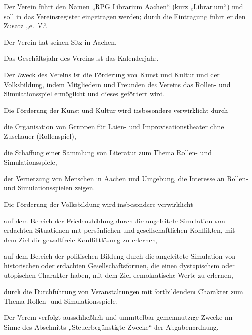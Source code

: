



\subject{Satzung des RPG Librarium Aachen}
\begin{contract}
	\item Der Verein führt den Namen „RPG Librarium Aachen“ (kurz „Librarium“) und soll in das Vereinsregister eingetragen werden; durch die Eintragung führt er den Zusatz „e.~V.“.
	\item Der Verein hat seinen Sitz in Aachen.
	\item Das Geschäftsjahr des Vereins ist das Kalenderjahr.
	\item Der Zweck des Vereins ist die Förderung von Kunst und Kultur und der Volksbildung, indem Mitgliedern und Freunden des Vereins das Rollen- und Simulationsspiel ermöglicht und dieses gefördert wird.
	\item Die Förderung der Kunst und Kultur wird insbesondere verwirklicht durch
	\begin{subpara}
		\item die Organisation von Gruppen für Laien- und Improvisationstheater ohne Zuschauer (Rollenspiel),
		\item die Schaffung einer Sammlung von Literatur zum Thema Rollen- und Simulationsspiele,
		\item der Vernetzung von Menschen in Aachen und Umgebung, die Interesse an Rollen- und Simulationsspielen zeigen.
	\end{subpara}
	\item Die Förderung der Volksbildung wird insbesondere verwirklicht 
	\begin{subpara}
		\item auf dem Bereich der Friedensbildung durch die angeleitete Simulation von erdachten Situationen mit persönlichen und gesellschaftlichen Konflikten, mit dem Ziel die gewaltfreie Konfliktlösung zu erlernen,
		\item auf dem Bereich der politischen Bildung durch die angeleitete Simulation von historischen oder erdachten Gesellschaftsformen, die einen dystopischem oder utopischen Charakter haben, mit dem Ziel demokratische Werte zu erlernen,
		\item durch die Durchführung von Veranstaltungen mit fortbildendem Charakter zum Thema Rollen- und Simulationsspiele.
	\end{subpara}
	\item Der Verein verfolgt ausschließlich und unmittelbar gemeinnützige Zwecke im Sinne des Abschnitts „Steuerbegünstigte Zwecke“ der Abgabenordnung.

\end{contract}
